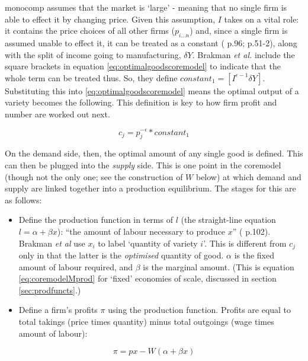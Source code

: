 {\Gls{monocomp} assumes that the market is `large' - meaning that no single firm is able to effect it by changing price. Given this assumption, $I$ takes on a vital role: it contains the price choices of all other firms ($p_{i \ldots n}$) and, since a single firm is assumed unable to effect it, it can be treated as a constant (\citealt{brakman_new_2009} p.96; \citealt{fujita_spatial_2001} p.51-2), along with the split of income going to manufacturing, $\delta Y$. Brakman \emph{et al.} include the square brackets in equation \eqref{eq:optimalgoodscoremodel} to indicate that the whole term can be treated thus. So, they define $constant_{1}=[I^{\epsilon-1} \delta Y ]$. Substituting this into \eqref{eq:optimalgoodscoremodel} means the optimal output of a variety becomes the following. This definition is key to how firm profit and number are worked out next.

\begin{equation}
c_{j} = p_{j}^{-\epsilon} * constant_{1}\label{eq:optimalgoodswconstant}
\end{equation}

On the demand side, then, the optimal amount of any single good is defined. This can then be plugged into the \emph{supply} side. This is one point in the \gls{coremodel} (though not the only one; see the construction of $W$ below) at which demand and supply are linked together into a production equilibrium. The stages for this are as follows:

\begin{itemize}
\item Define the production function in terms of $l$ (the straight-line equation $l = \alpha + \beta x$): ``the amount of labour necessary to produce $x$'' (\citealt{brakman_new_2009} p.102). Brakman \emph{et al} use $x_{i}$ to label `quantity of variety $i$'. This is different from $c_{j}$ only in that the latter is the \emph{optimised} quantity of good. $\alpha$ is the fixed amount of labour required, and $\beta$ is the marginal amount. (This is equation \ref{eq:coremodelMprod} for `fixed' economies of scale, discussed in section \ref{sec:prodfuncts}.)
\item Define a firm's profits $\pi$ using the production function. Profits are equal to total takings (price times quantity) minus total outgoings (wage times amount of labour):
\end{itemize}

\begin{equation}
\pi = px - W(\alpha + \beta x)\label{eq:profits}
\end{equation}

}
